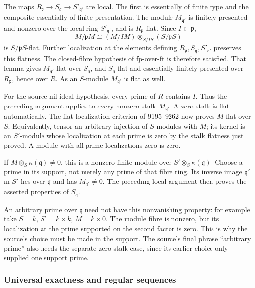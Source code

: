 The maps \(R_{\mathfrak p}\to S_{\mathfrak q}\to S'_{\mathfrak q'}\) are local. The first is essentially of finite type and the composite essentially of finite presentation. The module \(M_{\mathfrak q'}\) is finitely presented and nonzero over the local ring \(S'_{\mathfrak q'}\), and is \(R_{\mathfrak p}\)-flat. Since \(I\subset\mathfrak p\), \[
M/\mathfrak pM\cong (M/IM)\otimes_{S/IS}(S/\mathfrak pS)
\] is \(S/\mathfrak pS\)-flat. Further localization at the elements defining \(R_{\mathfrak p},S_{\mathfrak q},S'_{\mathfrak q'}\) preserves this flatness. The closed-fibre hypothesis of fp-over-ft is therefore satisfied. That lemma gives \(M_{\mathfrak q'}\) flat over \(S_{\mathfrak q}\), and \(S_{\mathfrak q}\) flat and essentially finitely presented over \(R_{\mathfrak p}\), hence over \(R\). As an \(S\)-module \(M_{\mathfrak q'}\) is flat as well.

For the source nil-ideal hypothesis, every prime of \(R\) contains \(I\). Thus the preceding argument applies to every nonzero stalk \(M_{\mathfrak q'}\). A zero stalk is flat automatically. The flat-localization criterion of 9195--9262 now proves \(M\) flat over \(S\). Equivalently, tensor an arbitrary injection of \(S\)-modules with \(M\); its kernel is an \(S'\)-module whose localization at each prime is zero by the stalk flatness just proved. A module with all prime localizations zero is zero.

If \(M\otimes_S\kappa(\mathfrak q)\ne0\), this is a nonzero finite module over \(S'\otimes_S\kappa(\mathfrak q)\). Choose a prime in its support, not merely any prime of that fibre ring. Its inverse image \(\mathfrak q'\) in \(S'\) lies over \(\mathfrak q\) and has \(M_{\mathfrak q'}\ne0\). The preceding local argument then proves the asserted properties of \(S_{\mathfrak q}\).

An arbitrary prime over \(\mathfrak q\) need not have this nonvanishing property: for example take \(S=k\), \(S'=k\times k\), \(M=k\times0\). The module fibre is nonzero, but its localization at the prime supported on the second factor is zero. This is why the source's choice must be made in the support. The source's final phrase ``arbitrary prime'' also needs the separate zero-stalk case, since its earlier choice only supplied one support prime.

\subsubsection{Universal exactness and regular sequences}\label{algebra-proof-038-universal-exactness-and-regular-sequences}

